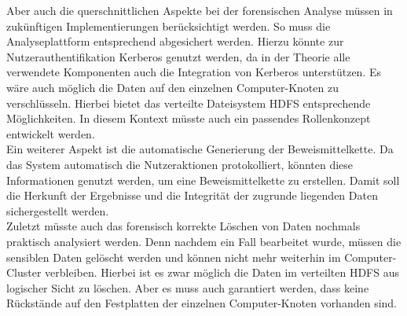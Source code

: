 \noindent
Aber auch die querschnittlichen Aspekte bei der forensischen Analyse müssen in zukünftigen Implementierungen berücksichtigt werden. So muss die Analyseplattform entsprechend abgesichert werden. Hierzu könnte zur Nutzerauthentifikation Kerberos genutzt werden, da in der Theorie alle verwendete Komponenten auch die Integration von Kerberos unterstützen. Es wäre auch möglich die Daten auf den einzelnen Computer-Knoten zu verschlüsseln. Hierbei bietet das verteilte Dateisystem HDFS entsprechende Möglichkeiten. In diesem Kontext müsste auch ein passendes Rollenkonzept entwickelt werden.\\
Ein weiterer Aspekt ist die automatische Generierung der Beweismittelkette. Da das System automatisch die Nutzeraktionen protokolliert, könnten diese Informationen genutzt werden, um eine Beweismittelkette zu erstellen. Damit soll die Herkunft der Ergebnisse und die Integrität der zugrunde liegenden Daten sichergestellt werden.\\
Zuletzt müsste auch das forensisch korrekte Löschen von Daten nochmals praktisch analysiert werden. Denn nachdem ein Fall bearbeitet wurde, müssen die sensiblen Daten gelöscht werden und können nicht mehr weiterhin im Computer-Cluster verbleiben. Hierbei ist es zwar möglich die Daten im verteilten HDFS aus logischer Sicht zu löschen. Aber es muss auch garantiert werden, dass keine Rückstände auf den Festplatten der einzelnen  Computer-Knoten vorhanden sind.